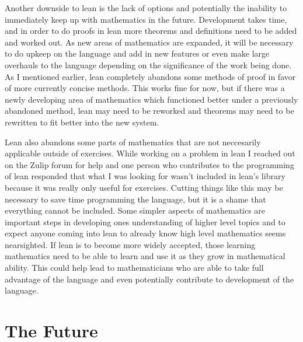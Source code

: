\documentclass[
  letterpaper,
]{scrreprt}
\theoremstyle{remark}
\begin{document}
Another downside to lean is the lack of options and potentially the
inability to immediately keep up with mathematics in the future.
Development takes time, and in order to do proofs in lean more theorems
and definitions need to be added and worked out. As new areas of
mathematics are expanded, it will be necessary to do upkeep on the
language and add in new features or even make large overhauls to the
language depending on the significance of the work being done. As I
mentioned earlier, lean completely abandons some methods of proof in
favor of more currently concise methods. This works fine for now, but if
there was a newly developing area of mathematics which functioned better
under a previously abandoned method, lean may need to be reworked and
theorems may need to be rewritten to fit better into the new system.

Lean also abandons some parts of mathematics that are not neccesarily
applicable outside of exercises. While working on a problem in lean I
reached out on the Zulip forum for help and one person who contributes
to the programming of lean responded that what I was looking for wasn't
included in lean's library because it was really only useful for
exercises. Cutting things like this may be necessary to save time
programming the language, but it is a shame that everything cannot be
included. Some simpler aspects of mathematics are important steps in
developing ones understanding of higher level topics and to expect
anyone coming into lean to already know high level mathematics seems
nearsighted. If lean is to become more widely accepted, those learning
mathematics need to be able to learn and use it as they grow in
mathematical ability. This could help lead to mathematicians who are
able to take full advantage of the language and even potentially
contribute to development of the language.

\hypertarget{the-future}{%
\section{The Future}\label{the-future}}
\end{document}

